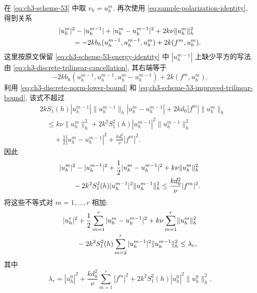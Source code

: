 \begin{Proof}
在 \eqref{eq:ch3-scheme-53} 中取 $v_h=u_h^m$. 再次使用 \eqref{eq:sample-polarization-identity}, 得到关系
\begin{align}
&|u_h^m|^2-|u_h^{m-1}|+|u_h^m-u_h^{m-1}|^2
+2k\nu\lVert u_h^m\rVert_h^2\notag\\
&\qquad=-2kb_h(u_h^{m-1},u_h^{m-1},u_h^m)+2k(f^m,u_h^m).
\label{eq:ch3-scheme-53-energy-identity}
\end{align}
这里按原文保留 \eqref{eq:ch3-scheme-53-energy-identity} 中 $|u_h^{m-1}|$ 上缺少平方的写法. 由 \eqref{eq:ch3-discrete-trilinear-cancellation}, 其右端等于
\[
-2kb_h(u_h^{m-1},u_h^{m-1},u_h^m-u_h^{m-1})+2k(f^m,u_h^m).
\]
利用 \eqref{eq:ch3-discrete-norm-lower-bound} 和 \eqref{eq:ch3-scheme-53-improved-trilinear-bound}, 该式不超过
\begin{align*}
&2kS_1(h)|u_h^{m-1}|\lVert u_h^{m-1}\rVert_h|u_h^m-u_h^{m-1}|
+2kd_0|f^m|\lVert u_h^m\rVert_h\\
&\quad\leq k\nu\lVert u_h^m\rVert_h^2
+2k^2S_1^2(h)|u_h^{m-1}|^2\lVert u_h^{m-1}\rVert_h^2\\
&\qquad+\frac12|u_h^m-u_h^{m-1}|^2
+\frac{kd_0^2}{\nu}|f^m|^2.
\end{align*}
因此
\begin{align}
&|u_h^m|^2-|u_h^{m-1}|^2+\frac12|u_h^m-u_h^{m-1}|^2
+k\nu\lVert u_h^m\rVert_h^2\notag\\
&\qquad-2k^2S_1^2(h)|u_h^{m-1}|^2\lVert u_h^{m-1}\rVert_h^2
\leq\frac{kd_0^2}{\nu}|f^m|^2.
\label{eq:ch3-scheme-53-step-inequality}
\end{align}
将这些不等式对 $m=1,\ldots,r$ 相加:
\begin{align}
&|u_h^r|^2+\frac12\sum_{m=1}^r|u_h^m-u_h^{m-1}|^2
+k\nu\sum_{m=1}^r\lVert u_h^m\rVert_h^2\notag\\
&\qquad-2k^2S_1^2(h)\sum_{m=2}^r
|u_h^{m-1}|^2\lVert u_h^{m-1}\rVert_h^2\leq\lambda_r,
\label{eq:ch3-scheme-53-summed-inequality}
\end{align}
其中
\begin{equation}
\lambda_r=|u_h^0|^2+\frac{kd_0^2}{\nu}\sum_{m=1}^r|f^m|^2
+2k^2S_1^2(h)|u_h^0|^2\lVert u_h^0\rVert_h^2.
\label{eq:ch3-scheme-53-lambda-r}
\end{equation}


\end{Proof}
